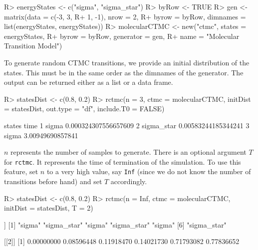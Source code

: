 \documentclass[
  nojss]{jss}
\begin{document}
\begin{CodeChunk}

\begin{CodeInput}
R> energyStates <- c("sigma", "sigma_star")
R> byRow <- TRUE
R> gen <- matrix(data = c(-3, 3,
R+                        1, -1), nrow = 2,
R+               byrow = byRow, dimnames = list(energyStates, energyStates))
R> molecularCTMC <- new("ctmc", states = energyStates, 
R+                  byrow = byRow, generator = gen, 
R+                  name = "Molecular Transition Model")      
\end{CodeInput}
\end{CodeChunk}

To generate random CTMC transitions, we provide an initial distribution of the states. This must be in the same order as the dimnames of the generator. The output can be returned either as a list or a data frame.

\begin{CodeChunk}

\begin{CodeInput}
R> statesDist <- c(0.8, 0.2)
R> rctmc(n = 3, ctmc = molecularCTMC, initDist = statesDist, out.type = "df", include.T0 = FALSE)
\end{CodeInput}

\begin{CodeOutput}
      states                 time
1      sigma 0.000324307556657609
2 sigma_star  0.00583244185344241
3      sigma     3.00949690857841
\end{CodeOutput}
\end{CodeChunk}

\(n\) represents the number of samples to generate. There is an optional argument \(T\) for \texttt{rctmc}. It represents the time of termination of the simulation. To use this feature, set \(n\) to a very high value, say \texttt{Inf} (since we do not know the number of transitions before hand) and set \(T\) accordingly.

\begin{CodeChunk}

\begin{CodeInput}
R> statesDist <- c(0.8, 0.2)
R> rctmc(n = Inf, ctmc = molecularCTMC, initDist = statesDist, T = 2)
\end{CodeInput}

\begin{CodeOutput}
[[1]]
[1] "sigma"      "sigma_star" "sigma"      "sigma_star" "sigma"     
[6] "sigma_star"

[[2]]
[1] 0.00000000 0.08596448 0.11918470 0.14021730 0.71793082 0.77836652
\end{CodeOutput}
\end{CodeChunk}
\end{document}

